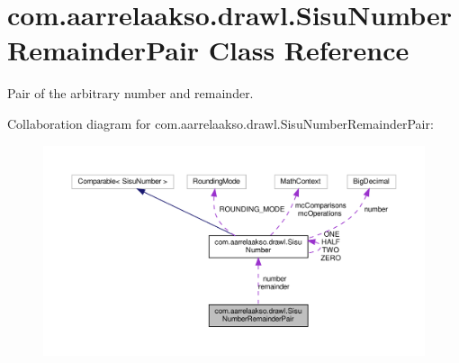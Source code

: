 \hypertarget{classcom_1_1aarrelaakso_1_1drawl_1_1_sisu_number_remainder_pair}{}\section{com.\+aarrelaakso.\+drawl.\+Sisu\+Number\+Remainder\+Pair Class Reference}
\label{classcom_1_1aarrelaakso_1_1drawl_1_1_sisu_number_remainder_pair}


Pair of the arbitrary number and remainder.  




Collaboration diagram for com.\+aarrelaakso.\+drawl.\+Sisu\+Number\+Remainder\+Pair\+:
\nopagebreak
\begin{figure}[H]
\begin{center}
\leavevmode
\includegraphics[width=350pt]{d3/d6a/classcom_1_1aarrelaakso_1_1drawl_1_1_sisu_number_remainder_pair__coll__graph}
\end{center}
\end{figure}
